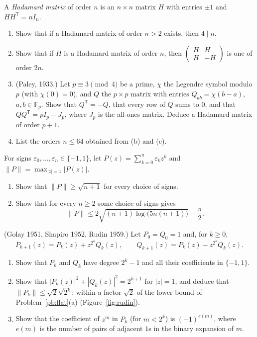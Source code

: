 \begin{exercise}[$\star\star\star$]\label{pb:hadamard}
A \emph{Hadamard matrix} of order $n$ is an $n\times n$ matrix $H$ with entries $\pm1$ and $HH^{\mathsf T}=nI_n$.
\begin{enumerate}[label=(\alph*)]
\item Show that if a Hadamard matrix of order $n>2$ exists, then $4\mid n$.
\item Show that if $H$ is a Hadamard matrix of order $n$, then $\begin{pmatrix}H&H\\H&-H\end{pmatrix}$ is one of order $2n$.
\item (Paley, 1933.) Let $p\equiv3\pmod4$ be a prime, $\chi$ the Legendre symbol modulo $p$ (with $\chi(0)=0$), and $Q$ the
$p\times p$ matrix with entries $Q_{ab}=\chi(b-a)$, $a,b\in\mathbb F_p$. Show that $Q^{\mathsf T}=-Q$, that every row of $Q$
sums to $0$, and that $QQ^{\mathsf T}=pI_p-J_p$, where $J_p$ is the all-ones matrix. Deduce a Hadamard matrix of order $p+1$.
\item List the orders $n\le64$ obtained from (b) and (c).
\end{enumerate}
\end{exercise}

\begin{exercise}[$\star\star\star$]\label{pb:flat}
For signs $\varepsilon_0,\dots,\varepsilon_n\in\{-1,1\}$, let $P(z)=\sum_{k=0}^n\varepsilon_kz^k$ and
$\|P\|=\max_{|z|=1}|P(z)|$.
\begin{enumerate}[label=(\alph*)]
\item Show that $\|P\|\ge\sqrt{n+1}$ for every choice of signs.
\item Show that for every $n\ge2$ some choice of signs gives
\[
\|P\|\le2\sqrt{(n+1)\log\bigl(5n(n+1)\bigr)}+\frac\pi2.
\]
\end{enumerate}
\end{exercise}

\begin{exercise}[$\star\star$]\label{pb:rudin}
(Golay 1951, Shapiro 1952, Rudin 1959.) Let $P_0=Q_0=1$ and, for $k\ge0$,
\[
P_{k+1}(z)=P_k(z)+z^{2^k}Q_k(z),\qquad Q_{k+1}(z)=P_k(z)-z^{2^k}Q_k(z).
\]
\begin{enumerate}[label=(\alph*)]
\item Show that $P_k$ and $Q_k$ have degree $2^k-1$ and all their coefficients in $\{-1,1\}$.
\item Show that $|P_k(z)|^2+|Q_k(z)|^2=2^{k+1}$ for $|z|=1$, and deduce that $\|P_k\|\le\sqrt2\sqrt{2^k}$: within a factor
$\sqrt2$ of the lower bound of Problem~\ref{pb:flat}(a) (Figure~\ref{fig:rudin}).
\item Show that the coefficient of $z^m$ in $P_k$ (for $m<2^k$) is $(-1)^{e(m)}$, where $e(m)$ is the number of pairs of
adjacent $1$s in the binary expansion of $m$.
\end{enumerate}
\end{exercise}


